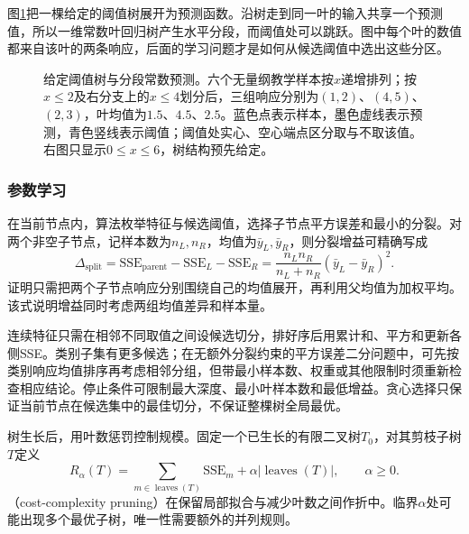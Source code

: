 图\ref{fig:regression-tree-prediction}把一棵给定的阈值树展开为预测函数。沿树走到同一叶的输入共享一个预测值，所以一维常数叶回归树产生水平分段，而阈值处可以跳跃。图中每个叶的数值都来自该叶的两条响应，后面的学习问题才是如何从候选阈值中选出这些分区。

\begin{figure}[t]
  \centering
  
  \caption{给定阈值树与分段常数预测。六个无量纲教学样本按$x$递增排列；按$x\leq2$及右分支上的$x\leq4$划分后，三组响应分别为$(1,2)$、$(4,5)$、$(2,3)$，叶均值为$1.5$、$4.5$、$2.5$。蓝色点表示样本，墨色虚线表示预测，青色竖线表示阈值；阈值处实心、空心端点区分取与不取该值。右图只显示$0\leq x\leq6$，树结构预先给定。}
  \label{fig:regression-tree-prediction}
\end{figure}

\subsubsection{参数学习}
\label{sec:regression-cart-learning}

在当前节点内，算法枚举特征与候选阈值，选择子节点平方误差和最小的分裂。对两个非空子节点，记样本数为$n_L,n_R$，均值为$\bar y_L,\bar y_R$，则分裂增益可精确写成
\begin{equation}
  \Delta_{\mathrm{split}}
  =\mathrm{SSE}_{\mathrm{parent}}
    -\mathrm{SSE}_{L}-\mathrm{SSE}_{R}
  =\frac{n_Ln_R}{n_L+n_R}(\bar y_L-\bar y_R)^2.
  \label{eq:regression-cart-gain}
\end{equation}
证明只需把两个子节点响应分别围绕自己的均值展开，再利用父均值为加权平均。该式说明增益同时考虑两组均值差异和样本量。

连续特征只需在相邻不同取值之间设候选切分，排好序后用累计和、平方和更新各侧SSE。类别子集有更多候选；在无额外分裂约束的平方误差二分问题中，可先按类别响应均值排序再考虑相邻分组，但带最小样本数、权重或其他限制时须重新检查相应结论。停止条件可限制最大深度、最小叶样本数和最低增益。贪心选择只保证当前节点在候选集中的最佳切分，不保证整棵树全局最优。

树生长后，用叶数惩罚控制规模。固定一个已生长的有限二叉树$T_0$，对其剪枝子树$T$定义
\begin{equation}
  R_\alpha(T)=\sum_{m\in\operatorname{leaves}(T)}
                    \mathrm{SSE}_m+\alpha|\operatorname{leaves}(T)|,
  \qquad\alpha\geq0.
  \label{eq:regression-pruning}
\end{equation}
（cost-complexity pruning）在保留局部拟合与减少叶数之间作折中。临界$\alpha$处可能出现多个最优子树，唯一性需要额外的并列规则。

